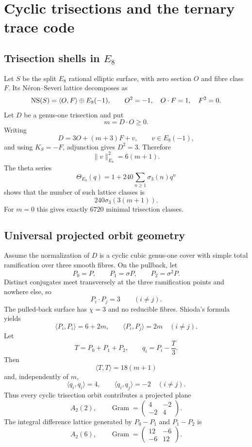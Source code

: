 \section{Cyclic trisections and the ternary trace code}

\subsection{Trisection shells in $E_8$}

Let $S$ be the split $E_8$ rational elliptic surface, with zero section $O$
and fibre class $F$.  Its N\'eron--Severi lattice decomposes as
\[
\operatorname{NS}(S)=\langle O,F\rangle\oplus E_8(-1),
\qquad
O^2=-1,\quad O\cdot F=1,\quad F^2=0.
\]
Let $D$ be a genus-one trisection and put
\[
m=D\cdot O\ge0.
\]
Writing
\[
D=3O+(m+3)F+v,
\qquad v\in E_8(-1),
\]
and using $K_S=-F$, adjunction gives $D^2=3$.  Therefore
\[
\boxed{\|v\|_{E_8}^2=6(m+1).}
\]
The theta series
\[
\Theta_{E_8}(q)=1+240\sum_{n\ge1}\sigma_3(n)q^n
\]
shows that the number of such lattice classes is
\[
\boxed{240\sigma_3(3(m+1)).}
\]
For $m=0$ this gives exactly $6720$ minimal trisection classes.

\subsection{Universal projected orbit geometry}

Assume the normalization of $D$ is a cyclic cubic genus-one cover with simple
total ramification over three smooth fibres.  On the pullback, let
\[
P_0=P,\qquad P_1=\sigma P,\qquad P_2=\sigma^2P.
\]
Distinct conjugates meet transversely at the three ramification points and
nowhere else, so
\[
P_i\cdot P_j=3\qquad(i\ne j).
\]
The pulled-back surface has $\chi=3$ and no reducible fibres.  Shioda's
formula yields
\[
\langle P_i,P_i\rangle=6+2m,
\qquad
\langle P_i,P_j\rangle=2m\quad(i\ne j).
\]
Let
\[
T=P_0+P_1+P_2,
\qquad
q_i=P_i-\frac{T}{3}.
\]
Then
\[
\langle T,T\rangle=18(m+1)
\]
and, independently of $m$,
\[
\boxed{
\langle q_i,q_i\rangle=4,
\qquad
\langle q_i,q_j\rangle=-2\quad(i\ne j).
}
\]
Thus every cyclic trisection orbit contributes a projected plane
\[
A_2(2),\qquad
\operatorname{Gram}=
\begin{pmatrix}4&-2\\-2&4\end{pmatrix}.
\]
The integral difference lattice generated by $P_0-P_1$ and $P_1-P_2$ is
\[
A_2(6),\qquad
\operatorname{Gram}=
\begin{pmatrix}12&-6\\-6&12\end{pmatrix}.
\]

